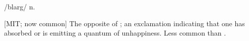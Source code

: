  /blarg/ n.

[MIT; now common] The opposite of ; an
exclamation indicating that one has absorbed or is emitting a quantum of
unhappiness. Less common than .

